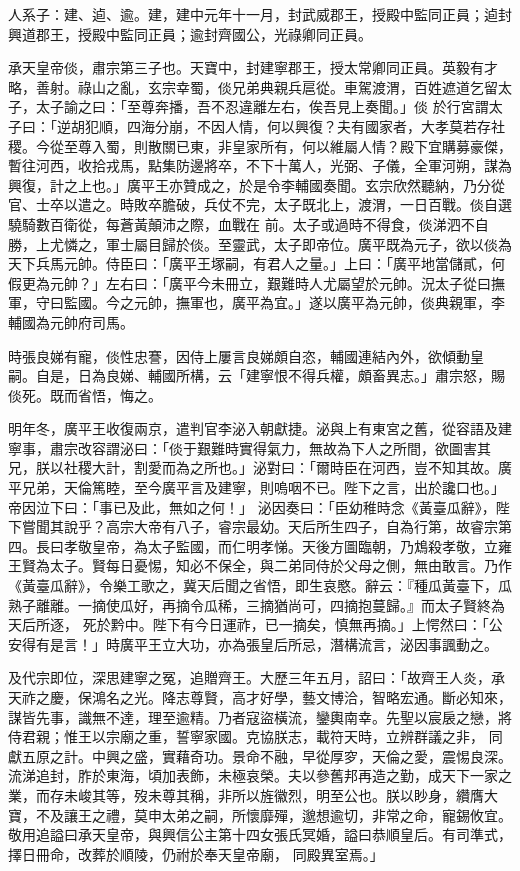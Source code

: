 \begin{pinyinscope}
 人系子：建、逌、逾。建，建中元年十一月，封武威郡王，授殿中監同正員；逌封興道郡王，授殿中監同正員；逾封齊國公，光祿卿同正員。



 承天皇帝倓，肅宗第三子也。天寶中，封建寧郡王，授太常卿同正員。英毅有才略，善射。祿山之亂，玄宗幸蜀，倓兄弟典親兵扈從。車駕渡渭，百姓遮道乞留太子，太子諭之曰：「至尊奔播，吾不忍違離左右，俟吾見上奏聞。」倓
 於行宮謂太子曰：「逆胡犯順，四海分崩，不因人情，何以興復？夫有國家者，大孝莫若存社稷。今從至尊入蜀，則散關已東，非皇家所有，何以維屬人情？殿下宜購募豪傑，暫往河西，收拾戎馬，點集防邊將卒，不下十萬人，光弼、子儀，全軍河朔，謀為興復，計之上也。」廣平王亦贊成之，於是令李輔國奏聞。玄宗欣然聽納，乃分從官、士卒以遣之。時敗卒膽破，兵仗不完，太子既北上，渡渭，一日百戰。倓自選驍騎數百衛從，每蒼黃顛沛之際，血戰在
 前。太子或過時不得食，倓涕泗不自勝，上尤憐之，軍士屬目歸於倓。至靈武，太子即帝位。廣平既為元子，欲以倓為天下兵馬元帥。侍臣曰：「廣平王塚嗣，有君人之量。」上曰：「廣平地當儲貳，何假更為元帥？」左右曰：「廣平今未冊立，艱難時人尤屬望於元帥。況太子從曰撫軍，守曰監國。今之元帥，撫軍也，廣平為宜。」遂以廣平為元帥，倓典親軍，李輔國為元帥府司馬。



 時張良娣有寵，倓性忠謇，因侍上屢言良娣頗自恣，輔國連結內外，欲傾動皇
 嗣。自是，日為良娣、輔國所構，云「建寧恨不得兵權，頗畜異志。」肅宗怒，賜倓死。既而省悟，悔之。



 明年冬，廣平王收復兩京，遣判官李泌入朝獻捷。泌與上有東宮之舊，從容語及建寧事，肅宗改容謂泌曰：「倓于艱難時實得氣力，無故為下人之所間，欲圖害其兄，朕以社稷大計，割愛而為之所也。」泌對曰：「爾時臣在河西，豈不知其故。廣平兄弟，天倫篤睦，至今廣平言及建寧，則嗚咽不已。陛下之言，出於讒口也。」帝因泣下曰：「事已及此，無如之何！」
 泌因奏曰：「臣幼稚時念《黃臺瓜辭》，陛下嘗聞其說乎？高宗大帝有八子，睿宗最幼。天后所生四子，自為行第，故睿宗第四。長曰孝敬皇帝，為太子監國，而仁明孝悌。天後方圖臨朝，乃鴆殺孝敬，立雍王賢為太子。賢每日憂惕，知必不保全，與二弟同侍於父母之側，無由敢言。乃作《黃臺瓜辭》，令樂工歌之，冀天后聞之省悟，即生哀愍。辭云：『種瓜黃臺下，瓜熟子離離。一摘使瓜好，再摘令瓜稀，三摘猶尚可，四摘抱蔓歸。』而太子賢終為天后所逐，
 死於黔中。陛下有今日運祚，已一摘矣，慎無再摘。」上愕然曰：「公安得有是言！」時廣平王立大功，亦為張皇后所忌，潛構流言，泌因事諷動之。



 及代宗即位，深思建寧之冤，追贈齊王。大歷三年五月，詔曰：「故齊王人炎，承天祚之慶，保鴻名之光。降志尊賢，高才好學，藝文博洽，智略宏通。斷必知來，謀皆先事，識無不達，理至逾精。乃者寇盜橫流，鑾輿南幸。先聖以宸扆之戀，將侍君親；惟王以宗廟之重，誓寧家國。克協朕志，載符天時，立辨群議之非，
 同獻五原之計。中興之盛，實藉奇功。景命不融，早從厚穸，天倫之愛，震惕良深。流涕追封，胙於東海，頃加表飾，未極哀榮。夫以參舊邦再造之勤，成天下一家之業，而存未峻其等，歿未尊其稱，非所以旌徽烈，明至公也。朕以眇身，纘膺大寶，不及讓王之禮，莫申太弟之嗣，所懷靡殫，邈想逾切，非常之命，寵錫攸宜。敬用追謚曰承天皇帝，與興信公主第十四女張氏冥婚，謚曰恭順皇后。有司準式，擇日冊命，改葬於順陵，仍祔於奉天皇帝廟，
 同殿異室焉。」




\end{pinyinscope}
